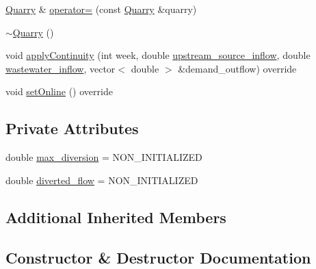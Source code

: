 \begin{DoxyCompactItemize}
\item 
\mbox{\hyperlink{classQuarry}{Quarry}} \& \mbox{\hyperlink{classQuarry_a17ba847f97bdee305ef75881cbf0ea9d_a17ba847f97bdee305ef75881cbf0ea9d}{operator=}} (const \mbox{\hyperlink{classQuarry}{Quarry}} \&quarry)
\item 
\mbox{\hyperlink{classQuarry_a6c528c6222e8e5adc134db5cafbe62e3_a6c528c6222e8e5adc134db5cafbe62e3}{$\sim$\+Quarry}} ()
\item 
void \mbox{\hyperlink{classQuarry_a6999b854a740ce92baaa610cf5b08bd9_a6999b854a740ce92baaa610cf5b08bd9}{apply\+Continuity}} (int week, double \mbox{\hyperlink{classWaterSource_a7a69b2e9b6030f1035e6cf44d2918ee5_a7a69b2e9b6030f1035e6cf44d2918ee5}{upstream\+\_\+source\+\_\+inflow}}, double \mbox{\hyperlink{classWaterSource_aeb5a2d2d83383a70ca20f3e94635a9c7_aeb5a2d2d83383a70ca20f3e94635a9c7}{wastewater\+\_\+inflow}}, vector$<$ double $>$ \&demand\+\_\+outflow) override
\item 
void \mbox{\hyperlink{classQuarry_af5fe04fa188d399485b2b4e64381e169_af5fe04fa188d399485b2b4e64381e169}{set\+Online}} () override
\end{DoxyCompactItemize}
\subsection*{Private Attributes}
\begin{DoxyCompactItemize}
\item 
double \mbox{\hyperlink{classQuarry_a5cb60f94475d5991a795cb9117e0b83f_a5cb60f94475d5991a795cb9117e0b83f}{max\+\_\+diversion}} = N\+O\+N\+\_\+\+I\+N\+I\+T\+I\+A\+L\+I\+Z\+ED
\item 
double \mbox{\hyperlink{classQuarry_ac2fe4ae274f23b1cc932655c5fb6263d_ac2fe4ae274f23b1cc932655c5fb6263d}{diverted\+\_\+flow}} = N\+O\+N\+\_\+\+I\+N\+I\+T\+I\+A\+L\+I\+Z\+ED
\end{DoxyCompactItemize}
\subsection*{Additional Inherited Members}


\subsection{Constructor \& Destructor Documentation}
\mbox{\label{classQuarry_a126fddda9e5deeb667a6a9dbb0533470_a126fddda9e5deeb667a6a9dbb0533470}} 
